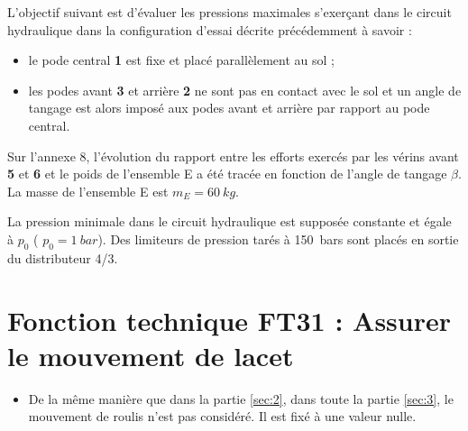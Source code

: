 

L’objectif suivant est d’évaluer les pressions maximales s’exerçant dans le circuit hydraulique dans la configuration
d’essai décrite précédemment à savoir :
\begin{itemize}
\item le pode central \textbf{1} est fixe et placé parallèlement au sol ;
\item les podes avant \textbf{3} et arrière \textbf{2} ne sont pas en contact avec le sol et un angle de tangage est alors imposé aux podes avant et arrière par rapport au pode central.
\end{itemize}
Sur l’annexe 8, l’évolution du rapport entre les efforts exercés par les vérins avant \textbf{5} et \textbf{6} et le poids de l’ensemble E a été tracée en fonction de l’angle de tangage $\beta$. La masse de l’ensemble E est $m_E = \SI{60}{kg}$.


La pression minimale dans le circuit hydraulique est supposée constante et égale à $p_0$ ( $p_0 = \SI{1}{bar}$). Des limiteurs de pression tarés à \SI{150}{bars} sont placés en sortie du distributeur 4/3.


\section{\label{sec:3}Fonction technique FT31 : Assurer le mouvement de lacet}

\begin{hypo}%

\begin{itemize}
\item De la même manière que dans la partie \ref{sec:2}, dans toute la partie \ref{sec:3}, le mouvement de roulis n’est pas considéré. Il est fixé à une valeur nulle.
\end{itemize}
\end{hypo}

